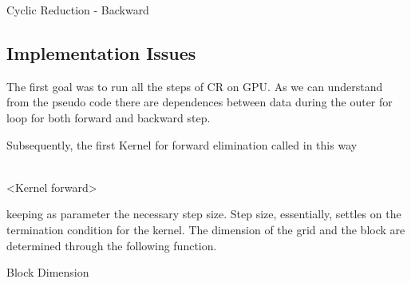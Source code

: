 \begin{algorithm}[H]
\begin{algorithmic}[1]
        	\State{\hspace*{2cm}\}}
        	\State{\}} 
\EndFunction
\end{algorithmic}
\caption{Cyclic Reduction - Backward}
\label{alg:Backward_cr}
\end{algorithm}


\subsection{Implementation Issues}


The first goal was to run all the steps of CR on GPU. As we can understand from the pseudo code there are dependences between data during the outer for loop for both forward and backward step. 

Subsequently, the first Kernel for forward elimination called in this way
\begin{algorithmic}
\\
 \hspace*{1cm}<Kernel forward>
\EndFor
\end{algorithmic}


keeping as parameter the necessary step size. Step size, essentially, settles on the termination condition for the kernel. The dimension of the grid and the block are determined through the following function.

\begin{algorithm}[H]
\begin{algorithmic}[1]
\EndFunction
\end{algorithmic}
\caption{Block Dimension}
\label{alg:calc_dim}
\end{algorithm}


